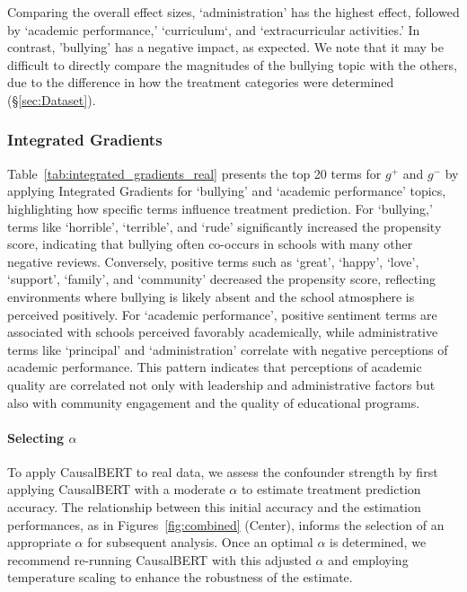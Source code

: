 \documentclass[11pt]{article}
\begin{document}
Comparing the overall effect sizes,  `administration' has the highest effect, followed by `academic performance,' `curriculum`, and `extracurricular activities.'  In contrast, 'bullying' has a negative impact, as expected. We note that it may be difficult to directly compare the magnitudes of the bullying topic with the others, due to the difference in how the treatment categories were determined (\S\ref{sec:Dataset}).

\subsubsection{Integrated Gradients}

Table~\ref{tab:integrated_gradients_real} presents the top 20 terms for $g^+$ and $g^-$ by applying Integrated Gradients for `bullying' and
`academic performance' topics, highlighting how specific terms influence treatment prediction. For `bullying,' terms like `horrible', `terrible', and `rude' significantly increased the propensity score, indicating that bullying often co-occurs in schools with many other negative reviews. Conversely, positive terms such as `great', `happy', `love', `support', `family', and `community' decreased the propensity score, reflecting environments where bullying is likely absent and the school
atmosphere is perceived positively. For `academic performance', positive sentiment terms are associated with schools perceived favorably academically, while administrative terms like `principal' and `administration' correlate with negative perceptions of academic performance. This pattern indicates that perceptions of academic quality are correlated not only with leadership and administrative factors but also with community engagement and the quality of educational programs.









\vspace{-.1cm}
\paragraph{Selecting $\alpha$}
To apply CausalBERT to real data, we assess the confounder strength by first applying CausalBERT with a moderate \(\alpha\) to estimate treatment prediction accuracy. The relationship between this initial accuracy and the estimation performances, as in Figures~\ref{fig:combined} (Center), informs the selection of an appropriate \(\alpha\) for subsequent analysis. Once an optimal \(\alpha\) is determined, we recommend re-running CausalBERT with this adjusted \(\alpha\) and employing temperature scaling to enhance the robustness of the estimate.
\end{document}
